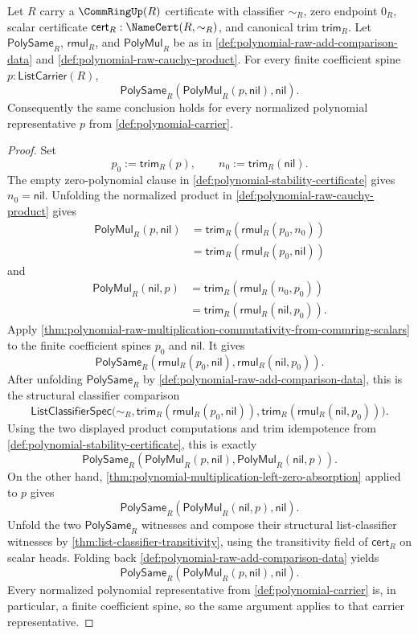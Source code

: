\begin{theorem}
\label{thm:polynomial-multiplication-right-zero-absorption}
Let $R$ carry a $\CommRingUp(R)$ certificate with classifier $\sim_R$, zero endpoint $0_R$, scalar certificate $\mathsf{cert}_R:\NameCert(R,\sim_R)$, and canonical trim $\mathsf{trim}_R$. Let $\mathsf{PolySame}_R$, $\mathsf{rmul}_R$, and $\mathsf{PolyMul}_R$ be as in \autoref{def:polynomial-raw-add-comparison-data} and \autoref{def:polynomial-raw-cauchy-product}. For every finite coefficient spine $p:\mathsf{ListCarrier}(R)$,
$$
\mathsf{PolySame}_R(\mathsf{PolyMul}_R(p,\mathsf{nil}),\mathsf{nil}).
$$
Consequently the same conclusion holds for every normalized polynomial representative $p$ from \autoref{def:polynomial-carrier}.
\end{theorem}
\begin{proof}
Set
$$
p_0:=\mathsf{trim}_R(p),
\qquad
n_0:=\mathsf{trim}_R(\mathsf{nil}).
$$
The empty zero-polynomial clause in \autoref{def:polynomial-stability-certificate} gives $n_0=\mathsf{nil}$. Unfolding the normalized product in \autoref{def:polynomial-raw-cauchy-product} gives
$$
\begin{aligned}
\mathsf{PolyMul}_R(p,\mathsf{nil})
&=\mathsf{trim}_R(\mathsf{rmul}_R(p_0,n_0))\\
&=\mathsf{trim}_R(\mathsf{rmul}_R(p_0,\mathsf{nil}))
\end{aligned}
$$
and
$$
\begin{aligned}
\mathsf{PolyMul}_R(\mathsf{nil},p)
&=\mathsf{trim}_R(\mathsf{rmul}_R(n_0,p_0))\\
&=\mathsf{trim}_R(\mathsf{rmul}_R(\mathsf{nil},p_0)).
\end{aligned}
$$
Apply \autoref{thm:polynomial-raw-multiplication-commutativity-from-commring-scalars} to the finite coefficient spines $p_0$ and $\mathsf{nil}$. It gives
$$
\mathsf{PolySame}_R(\mathsf{rmul}_R(p_0,\mathsf{nil}),\mathsf{rmul}_R(\mathsf{nil},p_0)).
$$
After unfolding $\mathsf{PolySame}_R$ by \autoref{def:polynomial-raw-add-comparison-data}, this is the structural classifier comparison
$$
\mathsf{ListClassifierSpec}\bigl(\sim_R,
\mathsf{trim}_R(\mathsf{rmul}_R(p_0,\mathsf{nil})),
\mathsf{trim}_R(\mathsf{rmul}_R(\mathsf{nil},p_0))\bigr).
$$
Using the two displayed product computations and trim idempotence from \autoref{def:polynomial-stability-certificate}, this is exactly
$$
\mathsf{PolySame}_R(\mathsf{PolyMul}_R(p,\mathsf{nil}),\mathsf{PolyMul}_R(\mathsf{nil},p)).
$$
On the other hand, \autoref{thm:polynomial-multiplication-left-zero-absorption} applied to $p$ gives
$$
\mathsf{PolySame}_R(\mathsf{PolyMul}_R(\mathsf{nil},p),\mathsf{nil}).
$$
Unfold the two $\mathsf{PolySame}_R$ witnesses and compose their structural list-classifier witnesses by \autoref{thm:list-classifier-transitivity}, using the transitivity field of $\mathsf{cert}_R$ on scalar heads. Folding back \autoref{def:polynomial-raw-add-comparison-data} yields
$$
\mathsf{PolySame}_R(\mathsf{PolyMul}_R(p,\mathsf{nil}),\mathsf{nil}).
$$
Every normalized polynomial representative from \autoref{def:polynomial-carrier} is, in particular, a finite coefficient spine, so the same argument applies to that carrier representative.
\end{proof}
